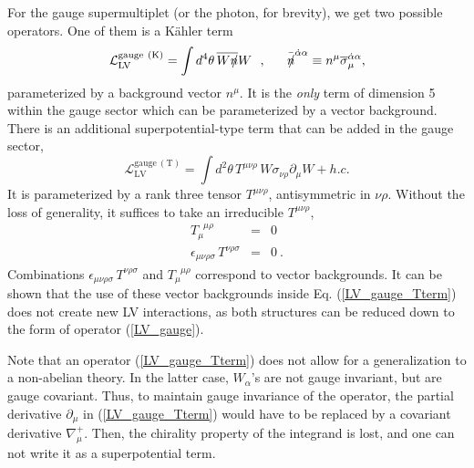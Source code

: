 \documentclass[paper,12pt]{revtex4}
\newcommand{\slashed}[1]{\hbox{{$#1$}\llap{$/$}}}
\begin{document}
	For the gauge supermultiplet (or the photon, for brevity), 
	we get two possible operators.
	One of them is a K\"ahler term
\begin{equation}
\label{LV_gauge}
	\mathcal{L}_{\mathrm{LV}}^{\mathrm{gauge\ (K)}} =
        \int d^4\theta \, \overline{W \slashed{n}}W    ~~,
         ~~~~~ \bar{\slashed{n}}^{\dot{\alpha}\alpha} \equiv
               n^\mu \overline{\sigma}_\mu^{\dot{\alpha}\alpha},
\end{equation}
	parameterized by a background vector $ n^\mu $.
	It is the {\it only} term of dimension 5 within the gauge
	sector which can be parameterized by a vector background. 
	There is an additional superpotential-type term that can be added  in  the gauge
	sector,
\begin{equation}
\label{LV_gauge_Tterm}
	\mathcal{L}_{\mathrm{LV}}^{\mathrm{gauge\ (T)}} =
	\int d^2\theta \, T^{\mu\nu\rho} \,
	        W \sigma_{\nu\rho} \partial_\mu W  + h.c.
\end{equation}
	It is parameterized by a rank three tensor 
  $ T^{\mu\nu\rho} $, antisymmetric in $\nu\rho$.
  Without the loss of generality, it suffices to take an 
  irreducible $ T^{\mu\nu\rho} $,
  \begin{eqnarray*}
	T_\mu^{\phantom{\mu}\mu\rho} & = & 0 \\
	\epsilon_{\mu\nu\rho\sigma}\, T^{\nu\rho\sigma} & = & 0~.
\end{eqnarray*}
    Combinations $\epsilon_{\mu\nu\rho\sigma}\, T^{\nu\rho\sigma}$ and 
    $T_\mu^{\phantom{\mu}\mu\rho}$ correspond to vector backgrounds.  
	It can be shown that the use of these vector backgrounds inside Eq. (\ref{LV_gauge_Tterm})
    does not create new LV interactions, as both structures can be reduced down to
	the form of operator (\ref{LV_gauge}).
	
	Note that an operator 
(\ref{LV_gauge_Tterm}) 
	does not allow for a generalization to a non-abelian theory. 
	In the latter case, $ W_\alpha $'s are not gauge invariant,
	but are gauge covariant.
	Thus, to maintain gauge invariance of the operator, the
	partial derivative $ \partial_\mu $ in 
	(\ref{LV_gauge_Tterm}) would have to be replaced by
	a covariant derivative $ \nabla_\mu^+ $. 
	Then, the chirality property of the integrand is lost,
	and one can not write it as a superpotential term.
\end{document}

